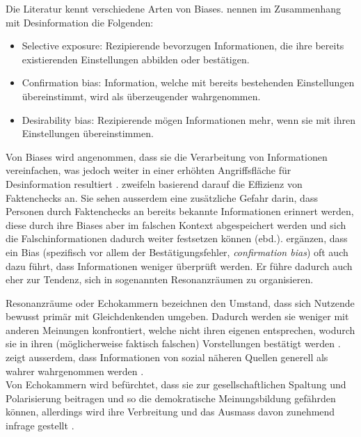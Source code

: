 \documentclass[12pt,a4paper]{article}        %
\begin{document}
Die Literatur kennt verschiedene Arten von Biases. \textcite{lazer_science_2018} nennen im Zusammenhang mit Desinformation die Folgenden:
\begin{itemize}
  \item{Selective exposure}: Rezipierende bevorzugen Informationen, die ihre bereits existierenden Einstellungen abbilden oder bestätigen.
  \item{Confirmation bias}: Information, welche mit bereits bestehenden Einstellungen übereinstimmt, wird als überzeugender wahrgenommen.
  \item{Desirability bias}: Rezipierende mögen Informationen mehr, wenn sie mit ihren Einstellungen übereinstimmen.
\end{itemize}
Von Biases wird angenommen, dass sie die Verarbeitung von Informationen vereinfachen, was jedoch weiter in einer erhöhten Angriffsfläche für Desinformation resultiert \parencite[5]{tandoc_jr_facts_2019}.  \textcite[1095]{lazer_science_2018} zweifeln basierend darauf die Effizienz von Faktenchecks an. Sie sehen ausserdem eine zusätzliche Gefahr darin, dass Personen durch Faktenchecks an bereits bekannte Informationen erinnert werden, diese durch ihre Biases aber im falschen Kontext abgespeichert werden und sich die Falschinformationen dadurch weiter festsetzen können (ebd.). \textcite[250]{hohlfeld_schlechte_2020} ergänzen, dass ein Bias (spezifisch vor allem der Bestätigungsfehler, \textit{confirmation bias}) oft auch dazu führt, dass Informationen weniger überprüft werden. Er führe dadurch auch eher zur Tendenz, sich in sogenannten Resonanzräumen zu organisieren.

Resonanzräume oder Echokammern bezeichnen den Umstand, dass sich Nutzende bewusst primär mit Gleichdenkenden umgeben. Dadurch werden sie weniger mit anderen Meinungen konfrontiert, welche nicht ihren eigenen entsprechen, wodurch sie in ihren (möglicherweise faktisch falschen) Vorstellungen bestätigt werden \parencites[250]{hohlfeld_schlechte_2020}[vgl.\ auch][8]{zoglauer_konstruierte_2021}[222]{schmidt_meinungsbildung_2022}[195]{krafft_disinformation_2020}[8]{grujic_warnhinweise_2024}[221]{allcott_social_2017}. \textcite[139]{tandoc_jr_defining_2018} zeigt ausserdem, dass Informationen von sozial näheren Quellen generell als wahrer wahrgenommen werden \parencite[vgl.\ auch][42]{levak_disinformation_2020}. \\ 
Von Echokammern wird befürchtet, dass sie zur gesellschaftlichen Spaltung und Polarisierung beitragen \parencite[8]{zoglauer_konstruierte_2021} und so die demokratische Meinungsbildung gefährden können, allerdings wird ihre Verbreitung und das Ausmass davon zunehmend infrage gestellt \parencite[222]{schmidt_meinungsbildung_2022}.
\end{document}
